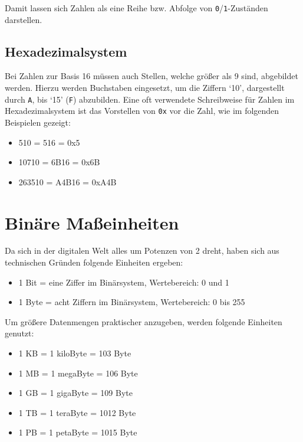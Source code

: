 \documentclass[
  letterpaper,
  DIV=11,
  numbers=noendperiod]{scrreprt}
\providecommand{\tightlist}{%
  \setlength{\itemsep}{0pt}\setlength{\parskip}{0pt}}\usepackage{longtable,booktabs,array}
\begin{document}
Damit lassen sich Zahlen als eine Reihe bzw. Abfolge von
\texttt{0}/\texttt{1}-Zuständen darstellen.

\subsection{Hexadezimalsystem}\label{hexadezimalsystem}

Bei Zahlen zur Basis 16 müssen auch Stellen, welche größer als 9 sind,
abgebildet werden. Hierzu werden Buchstaben eingesetzt, um die Ziffern
`10', dargestellt durch \texttt{A}, bis `15' (\texttt{F}) abzubilden.
Eine oft verwendete Schreibweise für Zahlen im Hexadezimalsystem ist das
Vorstellen von \texttt{0x} vor die Zahl, wie im folgenden Beispielen
gezeigt:

\begin{itemize}
\tightlist
\item
  510 = 516 = 0x5
\item
  10710 = 6B16 = 0x6B
\item
  263510 = A4B16 = 0xA4B
\end{itemize}

\section{Binäre Maßeinheiten}\label{binuxe4re-mauxdfeinheiten}

Da sich in der digitalen Welt alles um Potenzen von 2 dreht, haben sich
aus technischen Gründen folgende Einheiten ergeben:

\begin{itemize}
\tightlist
\item
  1 Bit = eine Ziffer im Binärsystem, Wertebereich: 0 und 1
\item
  1 Byte = acht Ziffern im Binärsystem, Wertebereich: 0 bis 255
\end{itemize}

Um größere Datenmengen praktischer anzugeben, werden folgende Einheiten
genutzt:

\begin{itemize}
\tightlist
\item
  1 KB = 1 kiloByte = 103 Byte
\item
  1 MB = 1 megaByte = 106 Byte
\item
  1 GB = 1 gigaByte = 109 Byte
\item
  1 TB = 1 teraByte = 1012 Byte
\item
  1 PB = 1 petaByte = 1015 Byte
\end{itemize}
\end{document}
